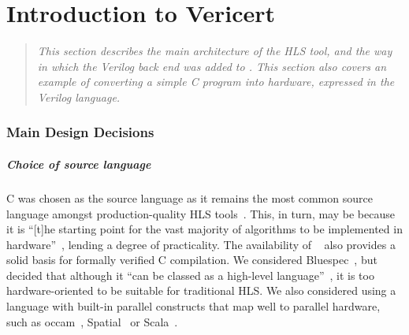 \chapter{Introduction to Vericert}%
\label{sec:introduction-to-vericert}

\begin{quote}\itshape
  This section describes the main architecture of the HLS tool, and the way in
  which the Verilog back end was added to \compcert{}.  This section also covers
  an example of converting a simple C program into hardware, expressed in the
  Verilog language.
\end{quote}

\subsection{Main Design Decisions}

\paragraph{Choice of source language}
C was chosen as the source language as it remains the most common source
language amongst production-quality HLS tools~\cite{canis13_l,
  amd23_vitis_high_synth, intel20_hsc, pilato13_bambu}. This, in turn, may be
because it is \enquote{[t]he starting point for the vast majority of algorithms
  to be implemented in hardware}~\cite{gajski10_what_hls}, lending a degree of
practicality.  The availability of
\compcert{}~\cite{leroy09_formal_verif_realis_compil} also provides a solid
basis for formally verified C compilation.
We considered Bluespec~\cite{nikhil04_bsv}, but decided that although it
\enquote{can be classed as a high-level language}~\cite{greaves19_resear_note},
it is too hardware-oriented to be suitable for traditional HLS.  We also
considered using a language with built-in parallel constructs that map well to
parallel hardware, such as occam~\cite{page91_compil_occam},
Spatial~\cite{koeplinger18_s} or Scala~\cite{bachrach12_chisel}.


